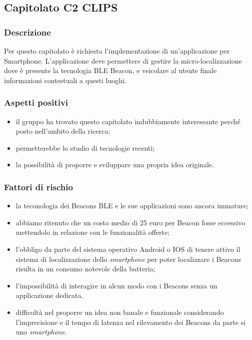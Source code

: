 \documentclass[12pt,a4paper]{article}
\begin{document}
\newpage

\subsection{Capitolato C2 CLIPS}

\subsubsection{Descrizione}

Per questo capitolato è richiesta l'implementazione di un'applicazione per Smartphone. L'applicazione deve permettere di gestire la micro-localizzazione dove è presente la tecnologia BLE Beacon, e veicolare al utente finale informazioni contestuali a questi luoghi. 

\subsubsection{Aspetti positivi}
\begin{itemize}
 \item il gruppo ha trovato questo capitolato indubbiamente interessante perché posto nell'ambito della ricerca;
 \item permetterebbe lo studio di tecnologie recenti;
 \item la possibilità di proporre e sviluppare una propria idea originale.
\end{itemize}

\subsubsection{Fattori di rischio}
\begin{itemize}
\item la teconologia dei Beacons BLE e le sue applicazioni sono ancora immature;
\item abbiamo ritenuto che un costo medio di 25 euro per Beacon fosse eccessivo mettendolo in relazione con le funzionalità offerte;
\item l'obbligo da parte del sistema operativo Android o IOS di tenere attivo il sistema di localizzazione dello \textit{smartphone} per poter localizzare i Beacons risulta in un consumo notevole della batteria;
\item l'impossibilità di interagire in alcun modo con i Beacons senza un applicazione dedicata.
\item difficoltà nel proporre un idea non banale e funzionale considerando l'imprecisione e il tempo di latenza nel rilevamento dei Beacons da parte si uno \textit{smartphone}.
\end{itemize}
\end{document}
